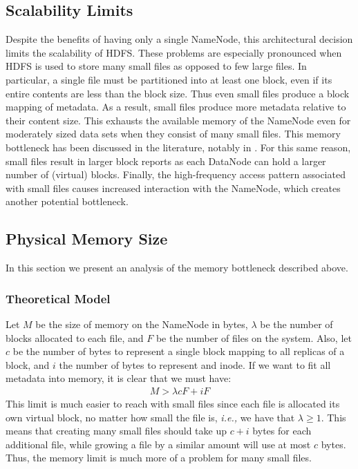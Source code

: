 \documentclass[11pt, a4paper]{article}
\begin{document}
\begin{multicols*}{2}
\section{Scalability Limits}\label{ScalabilityLimits}
Despite the benefits of having only a single NameNode, this architectural decision limits the scalability of HDFS. These problems are especially pronounced when HDFS is used to store many small files as opposed to few large files. In particular, a single file must be partitioned into at least one block, even if its entire contents are less than the block size. Thus even small files produce a block mapping of metadata. As a result, small files produce more metadata relative to their content size. This exhausts the available memory of the NameNode even for moderately sized data sets when they consist of many small files. This memory bottleneck has been discussed in the literature, notably in \cite{HdfsScale}. For this same reason, small files result in larger block reports as each DataNode can hold a larger number of (virtual) blocks. Finally, the high-frequency access pattern associated with small files causes increased interaction with the NameNode, which creates another potential bottleneck.

\subsection{Physical Memory Size}

In this section we present an analysis of the memory bottleneck described above.

\subsubsection{Theoretical Model}

Let $ M $ be the size of memory on the NameNode in bytes, $ \lambda $ be the number of blocks allocated to each file, and $ F $ be the number of files on the system. Also, let $ c $ be the number of bytes to represent a single block mapping to all replicas of a block, and $i$ the number of bytes to represent and inode. If we want to fit all metadata into memory, it is clear that we must have:
\begin{align*}
	M > \lambda c F + i F
\end{align*}
This limit is much easier to reach with small files since each file is allocated its own virtual block, no matter how small the file is, \textit{i.e.,} we have that $ \lambda \geq 1$. This means that creating many small files should take up $ c + i$ bytes for each additional file, while growing a file by a similar amount will use at most $ c $ bytes. Thus, the memory limit is much more of a problem for many small files. 
	

\end{multicols*}
\end{document}
